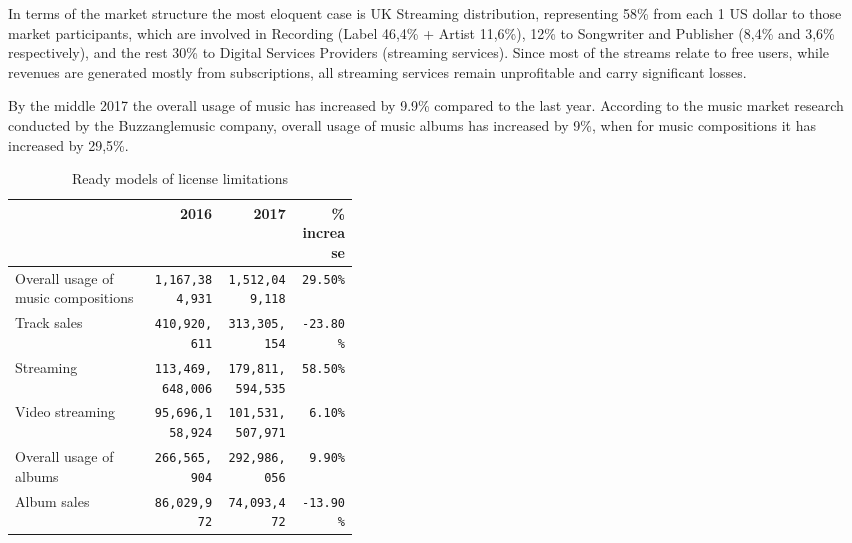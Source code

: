 \documentclass[12pt]{report}
\def\code#1{\colorbox{light-gray}{\texttt{#1}}}
\begin{document}
In terms of the market structure the most eloquent case is UK Streaming distribution, representing 58\% from each 1 US dollar to those market participants, which are involved in Recording (Label 46,4\% + Artist 11,6\%), 12\% to Songwriter and Publisher (8,4\% and 3,6\% respectively), and the rest 30\% to Digital Services Providers (streaming services). Since most of the streams relate to free users, while revenues are generated mostly from subscriptions, all streaming services remain unprofitable and carry significant losses.  
 
By the middle 2017 the overall usage of music has increased by 9.9\% compared to the last year.
According to the music market research conducted by the Buzzanglemusic company, overall usage of music albums has increased by 9\%, when for music compositions it has increased by 29,5\%.


\def\Prev{2016}
\def\Current{2017}
\def\Grow{\% increase}
\def\Summary{Overall usage of music compositions}
\def\Sales{Track sales}
\def\Streaming{Streaming}
\def\VideoStreaming{Video streaming}
\def\Albums{Overall usage of albums}
\def\AlbumsSales{Album sales}

\begin{table}[H]
\centering
\caption{Ready models of license limitations}
\begin{tabular}{p{0.4\linewidth}rrr}%
\toprule
& \Prev & \Current & \Grow \\
\toprule
\midrule
\Summary 			& \texttt{1,167,384,931} 		& \texttt{1,512,049,118} 		& \texttt{29.50\%} \\
\Sales 					& \texttt{410,920,611} 			& \texttt{313,305,154} 			& \texttt{-23.80\%} \\
\Streaming 			& \texttt{113,469,648,006} 	& \texttt{179,811,594,535} 	& \texttt{58.50\%} \\
\VideoStreaming 	& \texttt{95,696,158,924} 	& \texttt{101,531,507,971}		& \texttt{6.10\%} \\
\Albums 				& \texttt{266,565,904} 		& \texttt{292,986,056} 		& \texttt{9.90\%} \\
\AlbumsSales 		& \texttt{86,029,972} 			& \texttt{74,093,472}	 		& \texttt{-13.90\%} \\
\bottomrule
\end{tabular}
\end{table}
\end{document}
